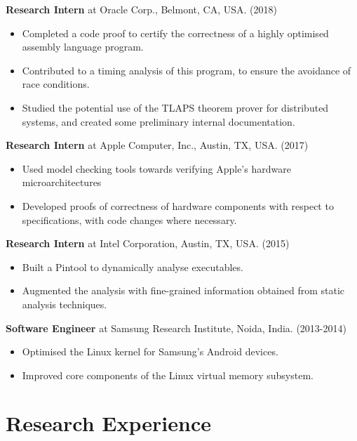 \documentclass[margin]{res}
\begin{document}
\begin{resume}
 {\bf Research Intern} at Oracle Corp., Belmont, CA, USA. \hfill (2018)
 \begin{itemize} \itemsep -2pt  %
 \item Completed a code proof to certify the correctness of a highly
   optimised assembly language program.
 \item Contributed to a timing analysis of this program, to ensure the
   avoidance of race conditions.
 \item Studied the potential use of the TLAPS theorem prover for
   distributed systems, and created some preliminary internal
   documentation.
 \end{itemize}

 {\bf Research Intern} at Apple Computer, Inc., Austin, TX,
 USA. \hfill (2017)
 \begin{itemize} \itemsep -2pt  %
 \item Used model checking tools towards verifying Apple's hardware microarchitectures
 \item Developed proofs of correctness of hardware components with
   respect to specifications, with code changes where necessary.
 \end{itemize}

 {\bf Research Intern} at Intel Corporation, Austin, TX, USA. \hfill
 (2015)
 \begin{itemize} \itemsep -2pt  %
 \item Built a Pintool to dynamically analyse executables.
 \item Augmented
   the analysis with fine-grained information obtained from static
   analysis techniques.
 \end{itemize}

 {\bf Software Engineer} at Samsung Research Institute, Noida, India. \hfill (2013-2014)
 \begin{itemize} \itemsep -2pt  %
 \item Optimised the Linux kernel for Samsung's
   Android devices.
 \item Improved core components of the Linux virtual memory subsystem.
 \end{itemize}

\section{Research Experience}


\end{resume}
\end{document}
